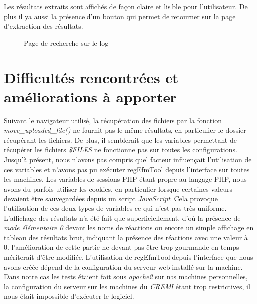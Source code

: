 Les résultats extraits sont affichés de façon claire et lisible pour l'utilisateur. De plus il ya aussi la présence d'un bouton qui permet de retourner sur la page d'extraction des résultats.

\begin{figure}[!ht]
	\begin{center}
		\caption{Page de recherche sur le log}
  		\label{chargement1}
  	\end{center}	
\end{figure}


\chapter{Difficultés rencontrées et améliorations à apporter}
Suivant le navigateur utilisé, la récupération des fichiers par la fonction \emph{ move\_uploaded\_file()} ne fournit pas le m\^eme résultats, en particulier le dossier récupérant les fichiers.
 De plus, il semblerait que les variables permettant de récupérer les fichiers \emph{\$FILES} ne fonctionne pas sur toutes les configurations. Jusqu'à présent, nous n'avons pas compris quel facteur influençait l'utilisation de ces variables et n'avons pas pu exécuter regEfmTool depuis l'interface sur toutes les machines.
Les variables de sessions PHP étant propre au langage PHP, nous avons du parfois utiliser les cookies, en particulier lorsque certaines valeurs devaient \^etre sauvegardées depuis un script \emph{JavaScript}. Cela provoque l'utilisation de ces deux types de variables ce qui n'est pas très uniforme.
L'affichage des résultats n'a été fait que superficiellement, d'où la présence de \emph{mode élémentaire 0} devant les noms de réactions ou encore un simple affichage en tableau des résultats brut, indiquant la présence des réactions avec une valeur à 0. l'amélioration de cette partie ne devant pas être trop gourmande en temps mériterait d'\^etre modifiée.
L'utilisation de regEfmTool depuis l'interface que nous avons créée dépend de la configuration du serveur web installé sur la machine. Dans notre cas les tests étaient fait sous \emph{apache2} sur nos machines personnelles, la configuration du serveur sur les machines du \emph{CREMI} étant trop restrictives, il nous était impossible d'exécuter le logiciel.